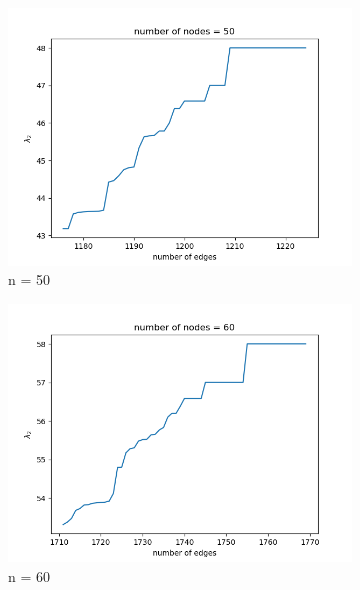 \documentclass{article}
\begin{document}
\begin{problem}
\begin{figure}[!ht]
\end{figure}
\newpage
\begin{figure}[!h]
    \centering
    \begin{subfigure}{0.35\textwidth}
        \includegraphics[width=\textwidth]{./img/p5_node50.png}
        \caption{n = 50}
    \end{subfigure}
    \begin{subfigure}{0.35\textwidth}
        \includegraphics[width=\textwidth]{./img/p5_node60.png}
        \caption{n = 60 }
    \end{subfigure}
    \begin{subfigure}{0.35\textwidth}

\end{subfigure}
\end{figure}
\end{problem}
\end{document}
